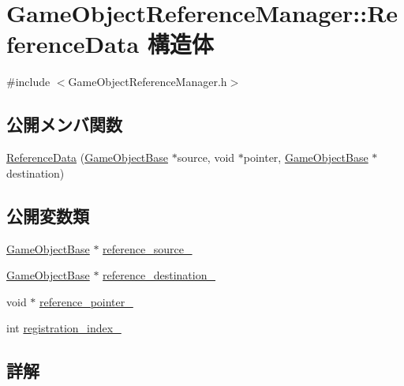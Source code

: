 \hypertarget{struct_game_object_reference_manager_1_1_reference_data}{}\section{Game\+Object\+Reference\+Manager\+:\+:Reference\+Data 構造体}
\label{struct_game_object_reference_manager_1_1_reference_data}


{\ttfamily \#include $<$Game\+Object\+Reference\+Manager.\+h$>$}

\subsection*{公開メンバ関数}
\begin{DoxyCompactItemize}
\item 
\mbox{\hyperlink{struct_game_object_reference_manager_1_1_reference_data_a3f1746e9c2998734776132c3734a69ae}{Reference\+Data}} (\mbox{\hyperlink{class_game_object_base}{Game\+Object\+Base}} $\ast$source, void $\ast$pointer, \mbox{\hyperlink{class_game_object_base}{Game\+Object\+Base}} $\ast$destination)
\end{DoxyCompactItemize}
\subsection*{公開変数類}
\begin{DoxyCompactItemize}
\item 
\mbox{\hyperlink{class_game_object_base}{Game\+Object\+Base}} $\ast$ \mbox{\hyperlink{struct_game_object_reference_manager_1_1_reference_data_a3a949f29b8484e8c9498a78e0c936ac4}{reference\+\_\+source\+\_\+}}
\item 
\mbox{\hyperlink{class_game_object_base}{Game\+Object\+Base}} $\ast$ \mbox{\hyperlink{struct_game_object_reference_manager_1_1_reference_data_af5d72ac9856b14efb3eee47d4c6db72a}{reference\+\_\+destination\+\_\+}}
\item 
void $\ast$ \mbox{\hyperlink{struct_game_object_reference_manager_1_1_reference_data_a360dfcbaa8421065a9d3b9d963ed576b}{reference\+\_\+pointer\+\_\+}}
\item 
int \mbox{\hyperlink{struct_game_object_reference_manager_1_1_reference_data_a36154b84fbcaa168786a74854cfda609}{registration\+\_\+index\+\_\+}}
\end{DoxyCompactItemize}


\subsection{詳解}


